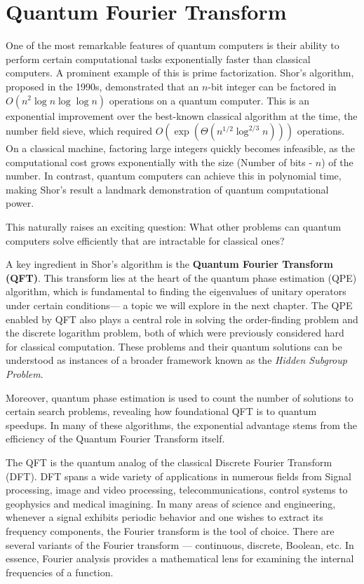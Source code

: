 \chapter{Quantum Fourier Transform}

One of the most remarkable features of quantum computers is their ability to perform certain computational tasks exponentially faster than classical computers. A prominent example of this is prime factorization. Shor’s algorithm, proposed in the 1990s, demonstrated that an $n$-bit integer can be factored in $O(n^2 \log n \log \log n)$ operations on a quantum computer. This is an exponential improvement over the best-known classical algorithm at the time, the number field sieve, which required $O\left(\exp\left(\Theta(n^{1/2} \log^{2/3} n)\right)\right)$ operations. On a classical machine, factoring large integers quickly becomes infeasible, as the computational cost grows exponentially with the size (Number of bits - $n$) of the number. In contrast, quantum computers can achieve this in polynomial time, making Shor's result a landmark demonstration of quantum computational power.

This naturally raises an exciting question: What other problems can quantum computers solve efficiently that are intractable for classical ones?

A key ingredient in Shor's algorithm is the \textbf{Quantum Fourier Transform (QFT)}. This transform lies at the heart of the quantum phase estimation (QPE) algorithm, which is fundamental to finding the eigenvalues of unitary operators under certain conditions— a topic we will explore in the next chapter. The QPE enabled by QFT also plays a central role in solving the order-finding problem and the discrete logarithm problem, both of which were previously considered hard for classical computation. These problems and their quantum solutions can be understood as instances of a broader framework known as the \textit{Hidden Subgroup Problem}.

Moreover, quantum phase estimation is used to count the number of solutions to certain search problems, revealing how foundational QFT is to quantum speedups. In many of these algorithms, the exponential advantage stems from the efficiency of the Quantum Fourier Transform itself.

The QFT is the quantum analog of the classical Discrete Fourier Transform (DFT). DFT spans a wide variety of applications in numerous fields from Signal processing, image and video processing, telecommunications, control systems to geophysics and medical imagining. In many areas of science and engineering, whenever a signal exhibits periodic behavior and one wishes to extract its frequency components, the Fourier transform is the tool of choice. There are several variants of the Fourier transform — continuous, discrete, Boolean, etc. In essence, Fourier analysis provides a mathematical lens for examining the internal frequencies of a function.

